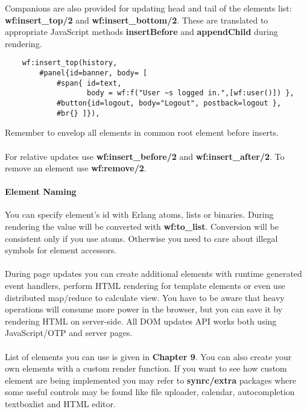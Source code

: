 Companions are also provided for updating head and tail
of the elements list: {\bf wf:insert\_top/2} and
{\bf wf:insert\_bottom/2}. These are translated to appropriate
JavaScript methods {\bf insertBefore} and {\bf appendChild} during rendering.

\vspace{1\baselineskip}
\begin{lstlisting}
    wf:insert_top(history,
        #panel{id=banner, body= [
            #span{ id=text,
                   body = wf:f("User ~s logged in.",[wf:user()]) },
            #button{id=logout, body="Logout", postback=logout },
            #br{} ]}),
\end{lstlisting}
\vspace{1\baselineskip}

Remember to envelop all elements in common root element before inserts.

\paragraph{}
For relative updates use {\bf wf:insert\_before/2} and {\bf wf:insert\_after/2}.
To remove an element use {\bf wf:remove/2}.

\paragraph{\bf Element Naming}
You can specify element's id with Erlang atoms,
lists or binaries. During rendering the value will be converted
with {\bf wf:to\_list}. Conversion will be consistent only if you use atoms.
Otherwise you need to care about illegal symbols for element accessors.

\paragraph{}
During page updates you can create additional elements with
runtime generated event handlers, perform HTML rendering for
template elements or even use distributed map/reduce to calculate view.
You have to be aware that heavy operations will consume
more power in the browser, but you can save it by rendering
HTML on server-side. All DOM updates API works both using
JavaScript/OTP and server pages.

\paragraph{}
List of elements you can use is given in {\bf Chapter 9}. You can also create
your own elements with a custom render function.
If you want to see how custom element are being implemented you may refer
to {\bf synrc/extra} packages where some useful controls may be found like
file uploader, calendar, autocompletion textboxlist and HTML editor.

